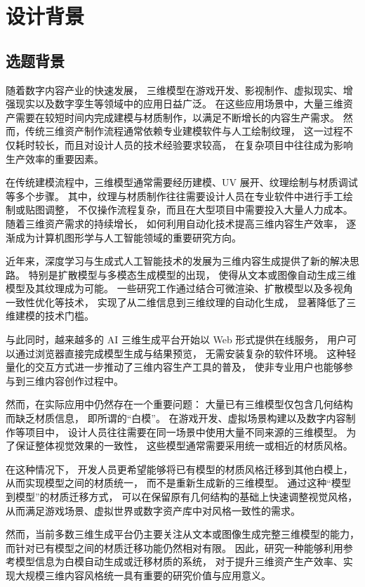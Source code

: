 \section{设计背景}

\subsection{选题背景}

随着数字内容产业的快速发展，
三维模型在游戏开发、影视制作、虚拟现实、增强现实以及数字孪生等领域中的应用日益广泛。\cite{赵沁平2009虚拟现实综述}
在这些应用场景中，大量三维资产需要在较短时间内完成建模与材质制作，以满足不断增长的内容生产需求。
然而，传统三维资产制作流程通常依赖专业建模软件与人工绘制纹理，
这一过程不仅耗时较长，而且对设计人员的技术经验要求较高，
在复杂项目中往往成为影响生产效率的重要因素。

在传统建模流程中，三维模型通常需要经历建模、UV 展开、纹理绘制与材质调试等多个步骤。
其中，纹理与材质制作往往需要设计人员在专业软件中进行手工绘制或贴图调整，
不仅操作流程复杂，而且在大型项目中需要投入大量人力成本。\cite{陈娜娜2025}
随着三维资产需求的持续增长，
如何利用自动化技术提高三维内容生产效率，
逐渐成为计算机图形学与人工智能领域的重要研究方向。

近年来，深度学习与生成式人工智能技术的发展为三维内容生成提供了新的解决思路。
特别是扩散模型与多模态生成模型的出现，
使得从文本或图像自动生成三维模型及其纹理成为可能。
一些研究工作通过结合可微渲染、扩散模型以及多视角一致性优化等技术，
实现了从二维信息到三维纹理的自动化生成，
显著降低了三维建模的技术门槛。

与此同时，越来越多的 AI 三维生成平台开始以 Web 形式提供在线服务，
用户可以通过浏览器直接完成模型生成与结果预览，
无需安装复杂的软件环境。
这种轻量化的交互方式进一步推动了三维内容生产工具的普及，
使非专业用户也能够参与到三维内容创作过程中。\cite{刘钊2023}

然而，在实际应用中仍然存在一个重要问题：
大量已有三维模型仅包含几何结构而缺乏材质信息，
即所谓的“白模”。
在游戏开发、虚拟场景构建以及数字内容制作等项目中，
设计人员往往需要在同一场景中使用大量不同来源的三维模型。
为了保证整体视觉效果的一致性，
这些模型通常需要采用统一或相近的材质风格。

在这种情况下，
开发人员更希望能够将已有模型的材质风格迁移到其他白模上，
从而实现模型之间的材质统一，
而不是重新生成新的三维模型。
通过这种“模型到模型”的材质迁移方式，
可以在保留原有几何结构的基础上快速调整视觉风格，
从而满足游戏场景、虚拟世界或数字资产库中对风格一致性的需求。

然而，当前多数三维生成平台仍主要关注从文本或图像生成完整三维模型的能力，
而针对已有模型之间的材质迁移功能仍然相对有限。
因此，研究一种能够利用参考模型信息为白模自动生成或迁移材质的系统，
对于提升三维资产生产效率、实现大规模三维内容风格统一具有重要的研究价值与应用意义。

